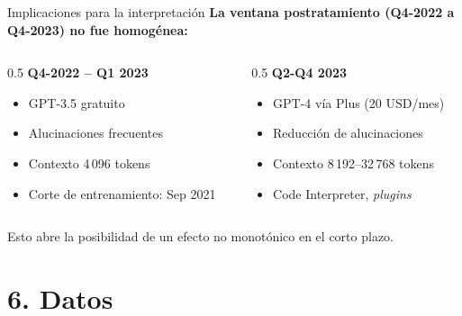 \documentclass[10pt,aspectratio=169]{beamer}
\begin{document}
\begin{frame}{Implicaciones para la interpretación}
\textbf{La ventana postratamiento (Q4-2022 a Q4-2023) no fue homogénea:}

\begin{columns}[T]
\begin{column}{0.5\textwidth}
\textbf{Q4-2022 -- Q1 2023}
\medskip

\small
\begin{itemize}\small
  \item GPT-3.5 gratuito
  \item Alucinaciones frecuentes
  \item Contexto 4\,096 tokens
  \item Corte de entrenamiento: Sep 2021
\end{itemize}
\end{column}
\begin{column}{0.5\textwidth}
\textbf{Q2-Q4 2023}
\medskip

\small
\begin{itemize}\small
  \item GPT-4 vía Plus (20 USD/mes)
  \item Reducción de alucinaciones
  \item Contexto 8\,192--32\,768 tokens
  \item Code Interpreter, \textit{plugins}
\end{itemize}
\end{column}
\end{columns}

\vspace{1em}
\centering \alert{Esto abre la posibilidad de un efecto no monotónico en el corto plazo.}
\end{frame}

\section{6. Datos}
\end{document}
